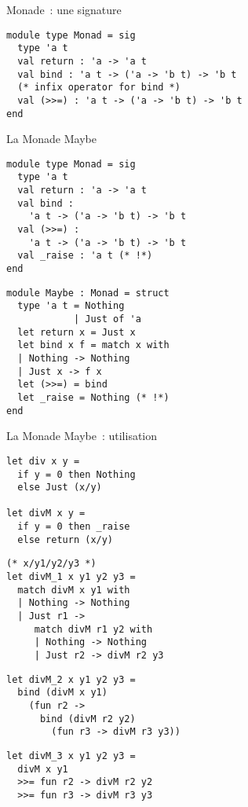 \documentclass[10pt]{beamer}
\begin{document}
\begin{frame}[fragile]{Monade~: une signature}
  \begin{verbatim}
module type Monad = sig
  type 'a t
  val return : 'a -> 'a t
  val bind : 'a t -> ('a -> 'b t) -> 'b t
  (* infix operator for bind *)
  val (>>=) : 'a t -> ('a -> 'b t) -> 'b t
end
  \end{verbatim}
\end{frame}

\begin{frame}[fragile]{La Monade Maybe}
  \begin{multicols}{2}
\begin{verbatim}
module type Monad = sig
  type 'a t
  val return : 'a -> 'a t
  val bind :
    'a t -> ('a -> 'b t) -> 'b t
  val (>>=) :
    'a t -> ('a -> 'b t) -> 'b t
  val _raise : 'a t (* !*)
end
\end{verbatim}
\begin{verbatim}
module Maybe : Monad = struct
  type 'a t = Nothing
            | Just of 'a
  let return x = Just x
  let bind x f = match x with
  | Nothing -> Nothing
  | Just x -> f x
  let (>>=) = bind
  let _raise = Nothing (* !*)
end
\end{verbatim}
  \end{multicols}
\end{frame}

\begin{frame}[fragile]{La Monade Maybe~: utilisation}
  \begin{multicols*}{2}
\begin{verbatim}
let div x y =
  if y = 0 then Nothing
  else Just (x/y)

let divM x y =
  if y = 0 then _raise
  else return (x/y)
\end{verbatim}
    \pause{}
\begin{verbatim}
(* x/y1/y2/y3 *)
let divM_1 x y1 y2 y3 =
  match divM x y1 with
  | Nothing -> Nothing
  | Just r1 ->
     match divM r1 y2 with
     | Nothing -> Nothing
     | Just r2 -> divM r2 y3
\end{verbatim}
    \columnbreak{}
    \pause{}
\begin{verbatim}
let divM_2 x y1 y2 y3 =
  bind (divM x y1)
    (fun r2 ->
      bind (divM r2 y2)
        (fun r3 -> divM r3 y3))
\end{verbatim}
    \pause{}
\begin{verbatim}
let divM_3 x y1 y2 y3 =
  divM x y1
  >>= fun r2 -> divM r2 y2
  >>= fun r3 -> divM r3 y3
\end{verbatim}
  \end{multicols*}
\end{frame}
\end{document}
